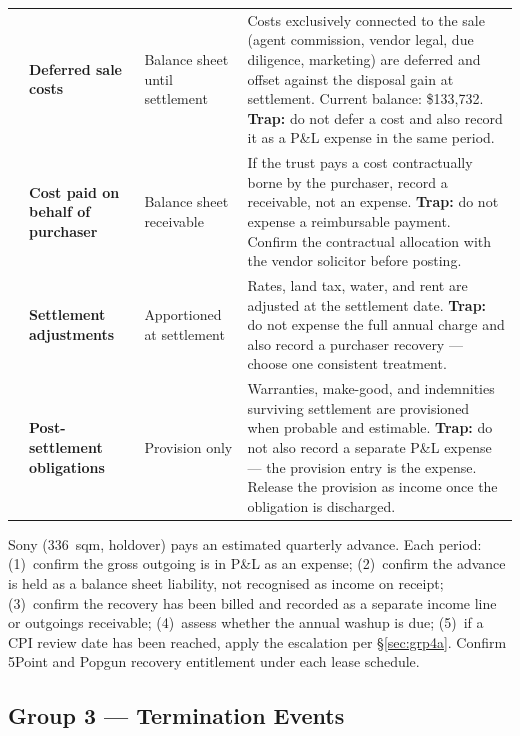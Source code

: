 \documentclass[10pt,a4paper]{article}
\begin{document}
{\begin{longtable}{@{} L{1.8cm} L{2.8cm} L{2.3cm} L{6.3cm} @{}}
& \textbf{Deferred sale costs} & Balance sheet until settlement & Costs exclusively connected to the sale (agent commission, vendor legal, due diligence, marketing) are deferred and offset against the disposal gain at settlement. Current balance: \$133,732. \textbf{Trap:} do not defer a cost and also record it as a P\&L expense in the same period. \\
& \textbf{Cost paid on behalf of purchaser} & Balance sheet receivable & If the trust pays a cost contractually borne by the purchaser, record a receivable, not an expense. \textbf{Trap:} do not expense a reimbursable payment. Confirm the contractual allocation with the vendor solicitor before posting. \\
& \textbf{Settlement adjustments} & Apportioned at settlement & Rates, land tax, water, and rent are adjusted at the settlement date. \textbf{Trap:} do not expense the full annual charge and also record a purchaser recovery --- choose one consistent treatment. \\
& \textbf{Post-settlement obligations} & Provision only & Warranties, make-good, and indemnities surviving settlement are provisioned when probable and estimable. \textbf{Trap:} do not also record a separate P\&L expense --- the provision entry is the expense. Release the provision as income once the obligation is discharged. \\
\bottomrule
\end{longtable}}

\begin{note}
Sony (336~sqm, holdover) pays an estimated quarterly advance. Each period: (1)~confirm the gross outgoing is in P\&L as an expense; (2)~confirm the advance is held as a balance sheet liability, not recognised as income on receipt; (3)~confirm the recovery has been billed and recorded as a separate income line or outgoings receivable; (4)~assess whether the annual washup is due; (5)~if a CPI review date has been reached, apply the escalation per \S\ref{sec:grp4a}. Confirm 5Point and Popgun recovery entitlement under each lease schedule.
\end{note}


\subsection{Group 3 --- Termination Events}
\label{sec:grp3}
\end{document}
